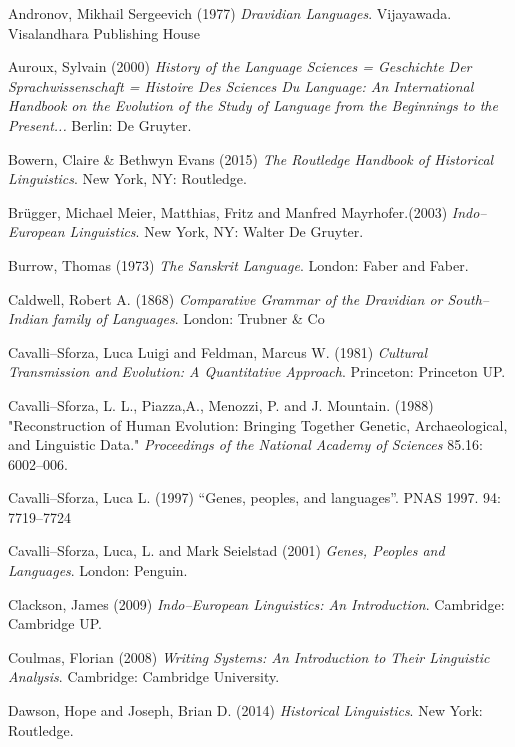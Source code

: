 \begin{thebibliography}{99}
 Andronov, Mikhail Sergeevich (1977) \textit{Dravidian Languages}. Vijayawada. Visalandhara Publishing House

  Auroux, Sylvain (2000) \textit{History of the Language Sciences = Geschichte Der Sprachwissenschaft = Histoire Des Sciences Du Language: An International Handbook on the Evolution of the Study of Language from the Beginnings to the Present...} Berlin: De Gruyter.

  Bowern, Claire \& Bethwyn Evans (2015) \textit{The Routledge Handbook of Historical Linguistics}. New York, NY: Routledge.

  Brügger, Michael Meier, Matthias, Fritz and Manfred Mayrhofer.(2003) \textit{Indo–European Linguistics}. New York, NY: Walter De Gruyter.

  Burrow, Thomas (1973) \textit{The Sanskrit Language}. London: Faber and Faber.

  Caldwell, Robert A. (1868) \textit{Comparative Grammar of the Dravidian or South–Indian family of Languages}. London: Trubner \& Co

  Cavalli–Sforza, Luca Luigi and Feldman, Marcus W. (1981) \textit{Cultural Transmission and Evolution: A Quantitative Approach}. Princeton: Princeton UP.

  Cavalli–Sforza, L. L., Piazza,A., Menozzi, P. and J. Mountain. (1988) "Reconstruction of Human Evolution: Bringing Together Genetic, Archaeological, and Linguistic Data." \textit{Proceedings of the National Academy of Sciences} 85.16: 6002–006.

  Cavalli–Sforza, Luca L. (1997) “Genes, peoples, and languages”. PNAS 1997. 94: 7719–7724

  Cavalli–Sforza, Luca, L. and Mark Seielstad (2001) \textit{Genes, Peoples and Languages}. London: Penguin.

  Clackson, James (2009) \textit{Indo–European Linguistics: An Introduction}. Cambridge: Cambridge UP.

  Coulmas, Florian (2008) \textit{Writing Systems: An Introduction to Their Linguistic Analysis}. Cambridge: Cambridge University.

  Dawson, Hope and Joseph, Brian D. (2014) \textit{Historical Linguistics}. New York: Routledge.


\end{thebibliography}
